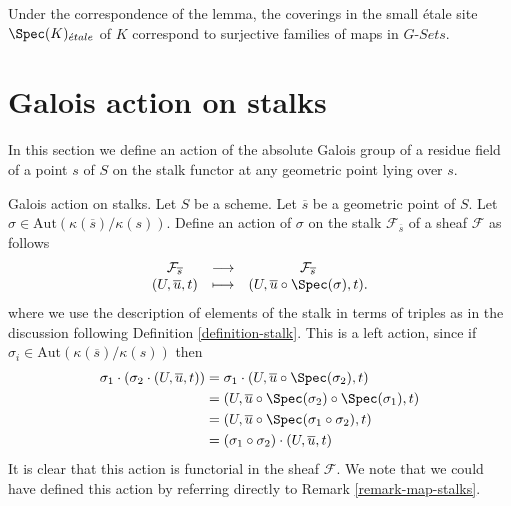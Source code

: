 \begin{remark}
\label{remark-covering-surjective}
Under the correspondence of the lemma, the coverings in the small \'etale site
$\Spec(K)_{\acute{e}tale}$ of $K$ correspond to surjective families of
maps in $G\textit{-Sets}$.
\end{remark}







\section{Galois action on stalks}
\label{section-galois-action-stalks}

\noindent
In this section we define an action of the absolute Galois group of a residue
field of a point $s$ of $S$ on the stalk functor at any geometric point lying
over $s$.

\medskip\noindent
Galois action on stalks.
Let $S$ be a scheme.
Let $\overline{s}$ be a geometric point of $S$.
Let $\sigma \in \text{Aut}(\kappa(\overline{s})/\kappa(s))$.
Define an action of $\sigma$ on the stalk $\mathcal{F}_{\overline{s}}$
of a sheaf $\mathcal{F}$ as follows
\begin{equation}
\label{equation-galois-action}
\begin{matrix}
\mathcal{F}_{\overline{s}} &
\longrightarrow &
\mathcal{F}_{\overline{s}} \\
(U, \overline{u}, t) &
\longmapsto &
(U, \overline{u} \circ \Spec(\sigma), t).
\end{matrix}
\end{equation}
where we use the description of elements of the stalk in terms of triples
as in the discussion following
Definition \ref{definition-stalk}.
This is a left action, since if
$\sigma_i \in \text{Aut}(\kappa(\overline{s})/\kappa(s))$
then
\begin{align*}
\sigma_1 \cdot (\sigma_2 \cdot (U, \overline{u}, t))
& =
\sigma_1 \cdot (U, \overline{u} \circ \Spec(\sigma_2), t) \\
& =
(U, \overline{u} \circ \Spec(\sigma_2) \circ \Spec(\sigma_1), t) \\
& =
(U, \overline{u} \circ \Spec(\sigma_1 \circ \sigma_2), t) \\
& =
(\sigma_1 \circ \sigma_2) \cdot (U, \overline{u}, t)
\end{align*}
It is clear that this action is functorial in the sheaf $\mathcal{F}$.
We note that we could have defined this action by referring directly to
Remark \ref{remark-map-stalks}.

